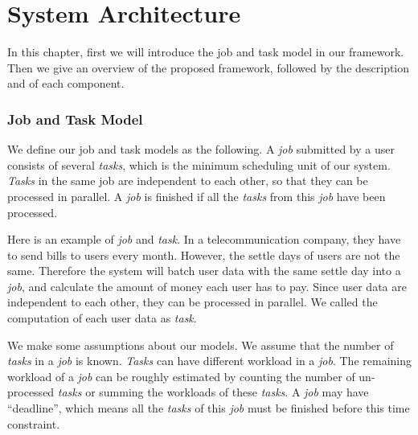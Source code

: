\chapter{System Architecture}\label{sec:arch}

In this chapter, first we will introduce the job and task model in our
framework.
Then we give an overview of the proposed framework, followed by the
description and of each component.


\subsection{Job and Task Model}	%

We define our job and task models as the following.
A \emph{job} submitted by a user consists of several \emph{tasks}, which
is the minimum scheduling unit of our system.
\emph{Tasks} in the same job are independent to each other, so that they
can be processed in parallel.
A \emph{job} is finished if all the \emph{tasks} from this \emph{job} have
been processed.

Here is an example of \emph{job} and \emph{task}.
In a telecommunication company, they have to send bills to users every
month.
However, the settle days of users are not the same.
Therefore the system will batch user data with the same settle day into
a \emph{job}, and calculate the amount of money each user has to pay.
Since user data are independent to each other, they can be processed in
parallel.
We called the computation of each user data as \emph{task}.

We make some assumptions about our models.
We assume that the number of \emph{tasks} in a \emph{job} is known.
\emph{Tasks} can have different workload in a \emph{job}.
The remaining workload of a \emph{job} can be roughly estimated by
counting the number of un-processed \emph{tasks} or summing the workloads
of these \emph{tasks}.
A \emph{job} may have ``deadline'', which means all the \emph{tasks} of
this \emph{job} must be finished before this time constraint.




